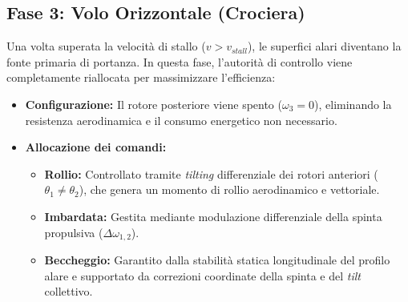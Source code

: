 \subsection{Fase 3: Volo Orizzontale (Crociera)}
Una volta superata la velocità di stallo ($v > v_{stall}$), le superfici alari diventano la fonte primaria di portanza. In questa fase, l'autorità di controllo viene completamente riallocata per massimizzare l'efficienza:
\begin{itemize}
    \item \textbf{Configurazione:} Il rotore posteriore viene spento ($\omega_3 = 0$), eliminando la resistenza aerodinamica e il consumo energetico non necessario.
    \item \textbf{Allocazione dei comandi:}
    \begin{itemize}
        \item \textbf{Rollio:} Controllato tramite \textit{tilting} differenziale dei rotori anteriori \hbox{($\theta_1 \neq \theta_2$)}, che genera un momento di rollio aerodinamico e vettoriale.
        \item \textbf{Imbardata:} Gestita mediante modulazione differenziale della spinta propulsiva ($\Delta \omega_{1,2}$).
        \item \textbf{Beccheggio:} Garantito dalla stabilità statica longitudinale del profilo alare e supportato da correzioni coordinate della spinta e del \textit{tilt} collettivo.
    \end{itemize}
\end{itemize}
